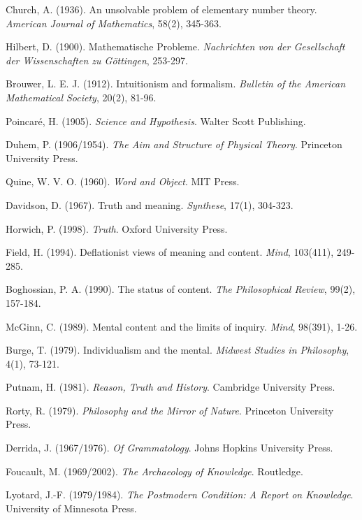 \documentclass[12pt,a4paper]{article}
\begin{document}
\begin{thebibliography}{99}
Church, A. (1936). An unsolvable problem of elementary number theory. \textit{American Journal of Mathematics}, 58(2), 345-363.

Hilbert, D. (1900). Mathematische Probleme. \textit{Nachrichten von der Gesellschaft der Wissenschaften zu Göttingen}, 253-297.

Brouwer, L. E. J. (1912). Intuitionism and formalism. \textit{Bulletin of the American Mathematical Society}, 20(2), 81-96.

Poincaré, H. (1905). \textit{Science and Hypothesis}. Walter Scott Publishing.

Duhem, P. (1906/1954). \textit{The Aim and Structure of Physical Theory}. Princeton University Press.

Quine, W. V. O. (1960). \textit{Word and Object}. MIT Press.

Davidson, D. (1967). Truth and meaning. \textit{Synthese}, 17(1), 304-323.

Horwich, P. (1998). \textit{Truth}. Oxford University Press.

Field, H. (1994). Deflationist views of meaning and content. \textit{Mind}, 103(411), 249-285.

Boghossian, P. A. (1990). The status of content. \textit{The Philosophical Review}, 99(2), 157-184.

McGinn, C. (1989). Mental content and the limits of inquiry. \textit{Mind}, 98(391), 1-26.

Burge, T. (1979). Individualism and the mental. \textit{Midwest Studies in Philosophy}, 4(1), 73-121.

Putnam, H. (1981). \textit{Reason, Truth and History}. Cambridge University Press.

Rorty, R. (1979). \textit{Philosophy and the Mirror of Nature}. Princeton University Press.

Derrida, J. (1967/1976). \textit{Of Grammatology}. Johns Hopkins University Press.

Foucault, M. (1969/2002). \textit{The Archaeology of Knowledge}. Routledge.

Lyotard, J.-F. (1979/1984). \textit{The Postmodern Condition: A Report on Knowledge}. University of Minnesota Press.


\end{thebibliography}
\end{document}
